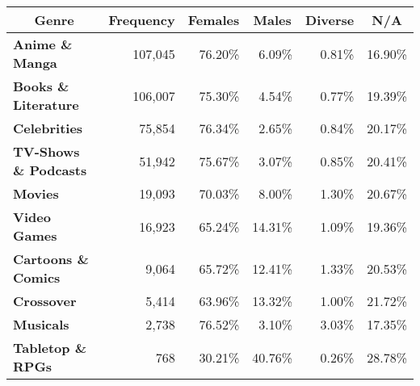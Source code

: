 \begin{table}[htb]
    \renewcommand{\arraystretch}{1.5}
    \centering
    \begin{tabular}{lrrrrr}
        \toprule
        \multicolumn{1}{c}{\textbf{Genre}} &
        \multicolumn{1}{c}{\textbf{Frequency}} &
        \multicolumn{1}{c}{\textbf{Females}} &
        \multicolumn{1}{c}{\textbf{Males}} &
        \multicolumn{1}{c}{\textbf{Diverse}} &
        \multicolumn{1}{c}{\textbf{N/A}} \\
        \midrule
        \textbf{Anime \& Manga}       & 107,045 & \cellcolor[HTML]{f86ef6}76.20\% & \cellcolor[HTML]{a0bff4}6.09\%  & \cellcolor[HTML]{def2e8}0.81\% & \cellcolor[HTML]{ffffff}16.90\% \\
        \textbf{Books \& Literature}  & 106,007 & \cellcolor[HTML]{f870f6}75.30\% & \cellcolor[HTML]{a2c1f4}4.54\%  & \cellcolor[HTML]{e1f3ea}0.77\% & \cellcolor[HTML]{fae4e2}19.39\% \\
        \textbf{Celebrities}          & 75,854  & \cellcolor[HTML]{f86ef6}76.34\% & \cellcolor[HTML]{a4c2f4}2.65\%  & \cellcolor[HTML]{dcf1e7}0.84\% & \cellcolor[HTML]{f9dbd9}20.17\% \\
        \textbf{TV-Shows \& Podcasts} & 51,942  & \cellcolor[HTML]{f870f6}75.67\% & \cellcolor[HTML]{a4c2f4}3.07\%  & \cellcolor[HTML]{dcf1e7}0.85\% & \cellcolor[HTML]{f8d9d6}20.41\% \\
        \textbf{Movies}               & 19,093  & \cellcolor[HTML]{f97df6}70.03\% & \cellcolor[HTML]{9dbdf3}8.00\%  & \cellcolor[HTML]{c0e6d4}1.30\% & \cellcolor[HTML]{f8d6d3}20.67\% \\
        \textbf{Video Games}          & 16,923  & \cellcolor[HTML]{f989f6}65.24\% & \cellcolor[HTML]{94b7f2}14.31\% & \cellcolor[HTML]{cdebdc}1.09\% & \cellcolor[HTML]{fae4e3}19.36\% \\
        \textbf{Cartoons \& Comics}   & 9,064   & \cellcolor[HTML]{f988f6}65.72\% & \cellcolor[HTML]{96b9f2}12.41\% & \cellcolor[HTML]{bfe5d2}1.33\% & \cellcolor[HTML]{f8d7d5}20.53\% \\
        \textbf{Crossover}            & 5,414   & \cellcolor[HTML]{fa8cf6}63.96\% & \cellcolor[HTML]{95b8f2}13.32\% & \cellcolor[HTML]{d3ede0}1.00\% & \cellcolor[HTML]{f5cac7}21.72\% \\
        \textbf{Musicals}             & 2,738   & \cellcolor[HTML]{f76df7}76.52\% & \cellcolor[HTML]{a4c2f4}3.10\%  & \cellcolor[HTML]{57bb8a}3.03\% & \cellcolor[HTML]{fffbfa}17.35\% \\
        \textbf{Tabletop \& RPGs}     & 768     & \cellcolor[HTML]{ffddf5}30.21\% & \cellcolor[HTML]{6d9eeb}40.76\% & \cellcolor[HTML]{ffffff}0.26\% & \cellcolor[HTML]{e67c73}28.78\% \\

\end{tabular}
\end{table}
